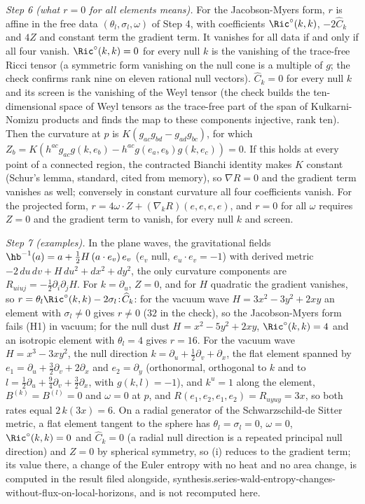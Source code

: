 \emph{Step 6 (what $r = 0$ for all elements means).} For the Jacobson-Myers form, $r$ is affine in the free data $(\theta_{l}, \sigma_{l}, \omega)$ of Step 4, with coefficients $\Ric^{\circ}(k,k)$, $-2\widehat{C}_{k}$ and $4Z$ and constant term the gradient term. It vanishes for all data if and only if all four vanish. $\Ric^{\circ}(k,k) = 0$ for every null $k$ is the vanishing of the trace-free Ricci tensor (a symmetric form vanishing on the null cone is a multiple of $g$; the check confirms rank nine on eleven rational null vectors). $\widehat{C}_{k} = 0$ for every null $k$ and its screen is the vanishing of the Weyl tensor (the check builds the ten-dimensional space of Weyl tensors as the trace-free part of the span of Kulkarni-Nomizu products and finds the map to these components injective, rank ten). Then the curvature at $p$ is $K(g_{ac}g_{bd} - g_{ad}g_{bc})$, for which $Z_{b} = K(h^{ac}g_{ac}g(k,e_{b}) - h^{ac}g(e_{a},e_{b})g(k,e_{c})) = 0$. If this holds at every point of a connected region, the contracted Bianchi identity makes $K$ constant (Schur's lemma, standard, cited from memory), so $\nabla R = 0$ and the gradient term vanishes as well; conversely in constant curvature all four coefficients vanish. For the projected form, $r = 4\omega\cdot Z + (\nabla_{k}R)(e,e,e,e)$, and $r = 0$ for all $\omega$ requires $Z = 0$ and the gradient term to vanish, for every null $k$ and screen.

\emph{Step 7 (examples).} In the plane waves, the gravitational fields $\hb^{-1}(a) = a + \tfrac12 H\,(a\cdot e_{v})\,e_{v}$ ($e_{v}$ null, $e_{u}\cdot e_{v} = -1$) with derived metric $-2\,du\,dv + H\,du^{2} + dx^{2} + dy^{2}$, the only curvature components are $R_{uiuj} = -\tfrac12\partial_{i}\partial_{j}H$. For $k = \partial_{u}$, $Z = 0$, and for $H$ quadratic the gradient vanishes, so $r = \theta_{l}\Ric^{\circ}(k,k) - 2\sigma_{l}\!:\!\widehat{C}_{k}$: for the vacuum wave $H = 3x^{2} - 3y^{2} + 2xy$ an element with $\sigma_{l} \neq 0$ gives $r \neq 0$ ($32$ in the check), so the Jacobson-Myers form fails (H1) in vacuum; for the null dust $H = x^{2} - 5y^{2} + 2xy$, $\Ric^{\circ}(k,k) = 4$ and an isotropic element with $\theta_{l} = 4$ gives $r = 16$. For the vacuum wave $H = x^{3} - 3xy^{2}$, the null direction $k = \partial_{u} + \tfrac12\partial_{v} + \partial_{x}$, the flat element spanned by $e_{1} = \partial_{u} + \tfrac32\partial_{v} + 2\partial_{x}$ and $e_{2} = \partial_{y}$ (orthonormal, orthogonal to $k$ and to $l = \tfrac12\partial_{u} + \tfrac94\partial_{v} + \tfrac32\partial_{x}$, with $g(k,l) = -1$), and $k^{u} = 1$ along the element, $B^{(k)} = B^{(l)} = 0$ and $\omega = 0$ at $p$, and $R(e_{1},e_{2},e_{1},e_{2}) = R_{uyuy} = 3x$, so both rates equal $2\,k(3x) = 6$. On a radial generator of the Schwarzschild-de Sitter metric, a flat element tangent to the sphere has $\theta_{l} = \sigma_{l} = 0$, $\omega = 0$, $\Ric^{\circ}(k,k) = 0$ and $\widehat{C}_{k} = 0$ (a radial null direction is a repeated principal null direction) and $Z = 0$ by spherical symmetry, so (i) reduces to the gradient term; its value there, a change of the Euler entropy with no heat and no area change, is computed in the result filed alongside, synthesis.series-wald-entropy-changes-without-flux-on-local-horizons, and is not recomputed here.

